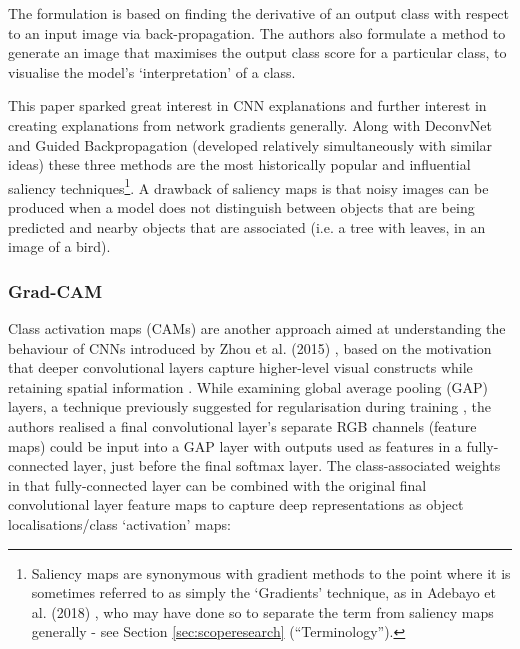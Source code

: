 \documentclass[main]{subfiles}
\begin{document}
The formulation is based on finding the derivative of an output class with respect to an input image via back-propagation. The authors also formulate a method to generate an image that maximises the output class score for a particular class, to visualise the model's `interpretation' of a class. 



This paper sparked great interest in CNN explanations and further interest in creating explanations from network gradients generally. Along with DeconvNet and Guided Backpropagation (developed relatively simultaneously with similar ideas) these three methods are the most historically popular and influential saliency techniques\footnote{Saliency maps are synonymous with gradient methods to the point where it is sometimes referred to as simply the `Gradients' technique, as in Adebayo et al. (2018) \cite{sanity}, who may have done so to separate the term from saliency maps generally - see Section \ref{sec:scoperesearch} (``Terminology'').}. A drawback of saliency maps is that noisy images can be produced when a model does not distinguish between objects that are being predicted and nearby objects that are associated (i.e. a tree with leaves, in an image of a bird).

\subsubsection{Grad-CAM}
Class activation maps (CAMs) are another approach aimed at understanding the behaviour of CNNs introduced by Zhou et al. (2015) \cite{cam}, based on the motivation that deeper convolutional layers capture higher-level visual constructs while retaining spatial information \cite{gradcam}. While examining global average pooling (GAP) layers, a technique previously suggested for regularisation during training \cite{nin}, the authors realised a final convolutional layer's separate RGB channels (feature maps) could be input into a GAP layer with outputs used as features in a fully-connected layer, just before the final softmax layer. The class-associated weights in that fully-connected layer can be combined with the original final convolutional layer feature maps to capture deep representations as object localisations/class `activation' maps:
\end{document}
